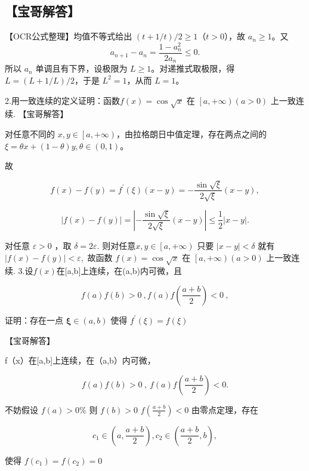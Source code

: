 \documentclass[11pt,fontset=fandol]{ctexart}
\begin{document}
\subsection{【宝哥解答】}\label{ux5b9dux54e5ux89e3ux7b54-4}

【OCR公式整理】均值不等式给出 \((t+1/t)/2\ge1\)（\(t>0\)），故
\(a_n\ge1\)。又 \[
a_{n+1}-a_n=\frac{1-a_n^2}{2a_n}\le0.
\] 所以 \(a_n\) 单调且有下界，设极限为 \(L\ge1\)。对递推式取极限，得
\(L=(L+1/L)/2\)，于是 \(L^2=1\)，从而 \(L=1\)。

2.用一致连续的定义证明：函数\(f( x ) = \cos { \sqrt { x } }\) 在
\(\textstyle { \left[ a , + \infty \right) ( a > 0 ) }\) 上一致连续.
【宝哥解答】

对任意不同的
\(x , y \in \left[ a , + \infty \right)\)，由拉格朗日中值定理，存在两点之间的
\(\xi = \theta x + ( 1 - \theta ) y , \theta \in ( 0 , 1 )\)。

故

\[
f ( x ) - f ( y ) = f ^ { \prime } ( \xi ) ( x - y ) = - \frac { \sin \sqrt { \xi } } { 2 \sqrt { \xi } } ( x - y ) ,
\]

\[
\left| f ( x ) - f ( y ) \right| = \left| - { \frac { \sin { \sqrt { \xi } } } { 2 { \sqrt { \xi } } } } ( x - y ) \right| \leq { \frac { 1 } { 2 } } { \big | } x - y { \big | } .
\]

对任意 \(\varepsilon > 0\) ，取 \(\delta = 2 \varepsilon .\)
则对任意\(x , y \in \left[ a , + \infty \right)\) 只要
\(\vert x - y \vert < \delta\) 就有
\(\vert f ( x ) - f ( y ) \vert < \varepsilon,\) 故函数
\(f ( x ) = \cos { \sqrt { x } }\) 在
\(\textstyle { \left[ a , + \infty \right) ( a > 0 ) }\) 上一致连续.
3.设\(f(x)\)在{[}a,b{]}上连续，在(a,b)内可微，且

\[
f ( a ) f ( b ) > 0 \ , f ( a ) f ( \frac { a + b } { 2 } ) < 0 \ ,
\]

证明：存在一点 \(\boldsymbol { \xi } \in ( a , b )\) 使得
\(f ^ { \prime } ( \xi ) = f ( \xi )\)

【宝哥解答】

f（x）在{[}a,b{]}上连续，在（a,b）内可微，

\[
f ( a ) f ( b ) > 0 ~ , ~ f ( a ) f ( \frac { a + b } { 2 } ) < 0 .
\]

不妨假设 \(f ( a ) > 0 \%\) 则 \(f ( b ) > 0\)
\(f ( \frac { a + b } { 2 } ) < 0\) 由零点定理，存在

\[
c _ { 1 } \in ( a , \frac { a + b } 2 ) , c _ { 2 } \in ( \frac { a + b } 2 , b ) ,
\]

使得 \(f ( c _ { 1 } ) = f ( c _ { 2 } ) = 0\)
\end{document}
